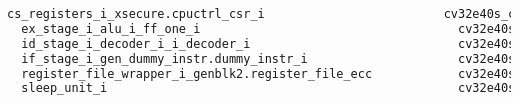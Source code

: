 \begin{lstlisting}[caption={Area report from synthesis of the CV32E40SDC.}, label=lst:cv32e40dc_area, language=txt]
  cs_registers_i_xsecure.cpuctrl_csr_i                         cv32e40s_csr_LIB0_WIDTH32_SHADOWCOPY1_RESETVALUE25          21     32.832    28.376       61.208 
  ex_stage_i_alu_i_ff_one_i                                    cv32e40s_ff_one_6850                                        52     85.158    50.347      135.505 
  id_stage_i_decoder_i_i_decoder_i                             cv32e40s_i_decoder_CLIC0_3572                              167    252.054   158.433      410.487 
  if_stage_i_gen_dummy_instr.dummy_instr_i                     cv32e40s_dummy_instr_3569                                   56    126.882    59.469      186.351 
  register_file_wrapper_i_genblk2.register_file_ecc            cv32e40s_register_file_ecc_REGFILE_NUM_READ_PORTS2         190    462.384   150.451      612.835 
  sleep_unit_i                                                 cv32e40s_sleep_unit_LIB0_6852                                7     21.204     4.067       25.271 


\end{lstlisting}

